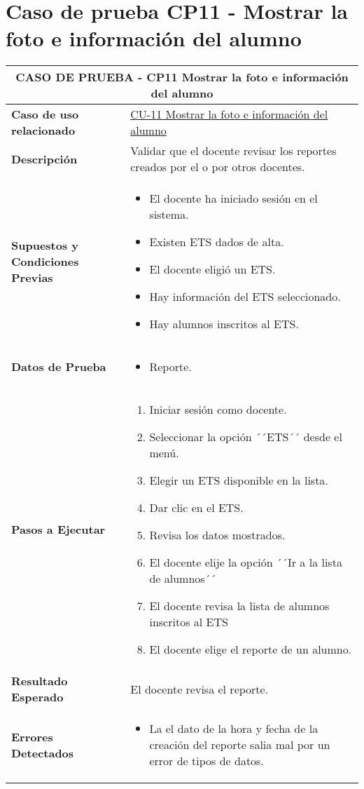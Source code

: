 \section{Caso de prueba CP11 - Mostrar la foto e información del alumno}

\begin{longtable}{|p{5cm}|p{10cm}|}
	\hline
	\multicolumn{2}{|c|}{\textbf{CASO DE PRUEBA - CP11 Mostrar la foto e información del alumno}} \\
	\hline
	\textbf{Caso de uso relacionado} & \hyperref[CU-11]{CU-11 Mostrar la foto e información del alumno}\\
	\hline
	\textbf{Descripción} & Validar que el docente revisar los reportes creados por el o por otros docentes. \\
	\hline
	\textbf{Supuestos y Condiciones Previas} & 
	\begin{itemize}
		\item El docente ha iniciado sesión en el sistema.
		\item Existen ETS dados de alta.
		\item El docente eligió un ETS.
		\item Hay información del ETS seleccionado.
		\item Hay alumnos inscritos al ETS.
		
	\end{itemize} \\
	\hline
	\textbf{Datos de Prueba} & 
	\begin{itemize}
		\item Reporte. 
	\end{itemize} \\
	\hline
	\textbf{Pasos a Ejecutar} & 
	\begin{enumerate}
		\item Iniciar sesión como docente.
		\item Seleccionar la opción ´´ETS´´ desde el menú.
		\item Elegir un ETS disponible en la lista.
		\item Dar clic en el ETS.
		\item Revisa los datos mostrados.
		\item El docente elije la opción ´´Ir a la lista de alumnos´´
		\item El docente revisa la lista de alumnos inscritos al ETS
		\item El docente elige el reporte de un alumno.
	\end{enumerate} \\
	\hline
	\textbf{Resultado Esperado} & 
	El docente revisa el reporte. \\	
	\hline
	\textbf{Errores Detectados} & 
	\begin{itemize}
		\item La el dato de la hora y fecha de la creación del reporte salia mal por un error de tipos de datos.


\end{itemize}
\end{longtable}

